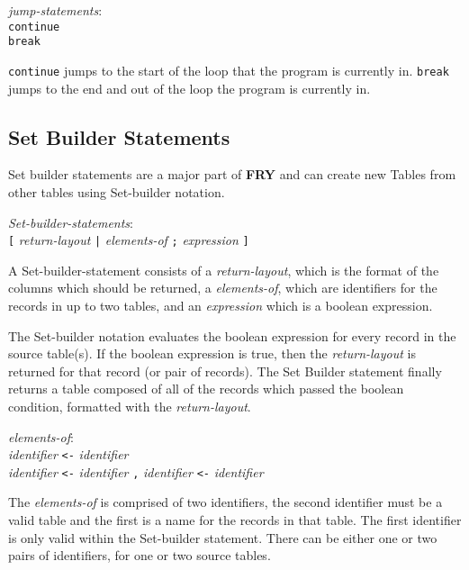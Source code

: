 \documentclass{article}
\begin{document}
\begin{tabbing}
	\= \emph{jump}\=\emph{-statements}: \\
	\> \> \texttt{continue} \\
	\> \> \texttt{break}
\end{tabbing}
\texttt{continue} jumps to the start of the loop that the program is currently in. \texttt{break} jumps to the end and out of the loop the program is currently in.

\subsection{Set Builder Statements}
\label{sec:setbuild}
Set builder statements are a major part of \textbf{FRY} and can create new Tables from other tables using Set-builder notation.
\begin{tabbing}
	\= \emph{Set-bu}\=\emph{ilder-statements}: \\
	\> \> \texttt{[} \emph{return-layout} \texttt{|} \emph{elements-of} \texttt{;} \emph{expression} \texttt{]}
\end{tabbing}

A Set-builder-statement consists of a \emph{return-layout}, which is the format of the columns which should be returned, a \emph{elements-of}, which are identifiers for the records in up to two tables, and an \emph{expression} which is a boolean expression.

 The Set-builder notation evaluates the boolean expression for every record in the source table(s). If the boolean expression is true, then the \emph{return-layout} is returned for that record (or pair of records). The Set Builder statement finally returns a table composed of all of the records which passed the boolean condition, formatted with the \emph{return-layout}.

\begin{tabbing}
	\= \emph{elem}\=\emph{ents-of}: \\
	\> \> \emph{identifier} \texttt{<-} \emph{identifier} \\
	\> \> \emph{identifier} \texttt{<-} \emph{identifier} \texttt{,}  \emph{identifier} \texttt{<-} \emph{identifier}
\end{tabbing}

The \emph{elements-of} is comprised of two identifiers, the second identifier must be a valid table and the first is a name for the records in that table. The first identifier is only valid within the Set-builder statement. There can be either one or two pairs of identifiers, for one or two source tables.
\end{document}
